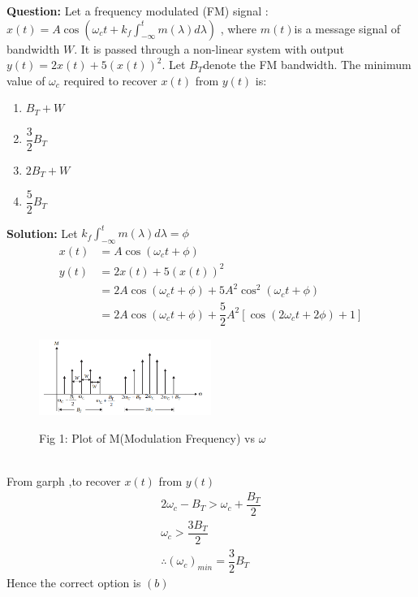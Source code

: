 \documentclass[journal,12pt,twocolumn]{IEEEtran}
\theoremstyle{remark}
\begin{document}
\textbf{Question:} Let a frequency modulated (FM) signal : $ x(t) = A \cos(\omega_c t + k_f \int_{-\infty}^{t} m(\lambda) d\lambda)$ , where $ m(t) $is a message signal of bandwidth $ W $. It is passed through a non-linear system with output $y(t) = 2x(t) + 5(x(t))^2 $.
Let $B_T $denote the FM bandwidth. The minimum value of $ \omega_c $ required to recover $ x(t) $ from $ y(t) $ is:\\
\begin{enumerate}[label = (\Alph*)]
\item $B_T + W$ \\
\item $\dfrac{3}{2} B_T$ \\
\item $2B_T + W$ \\
\item $\dfrac{5}{2} B_T$ \\
\end{enumerate}
\textbf{Solution: }
Let $k_f \int_{-\infty}^{t} m(\lambda) d\lambda = \phi $
\begin{align}
 x(t) &= A \cos(\omega_c t + \phi) \\
 y(t) &= 2x(t) + 5(x(t))^2 \\
 &= 2A \cos(\omega_c t + \phi) + 5A^{2}\cos^{2}(\omega_c t +  \phi  ) \\
 &= 2A \cos(\omega_c t +  \phi ) + \dfrac{5}{2}A^{2}[\cos(2\omega_c t +  2\phi ) + 1]
 \end{align}
\begin{figure}[h!]
  \centering
  \includegraphics[width=0.5\textwidth]{figures/cggate.png} 
 \label{cggatefig1}
 \caption*{Fig 1: Plot of M(Modulation Frequency) vs $\omega$  }
\end{figure}
\\From garph ,to recover $x(t)$ from $y(t)$
\begin{align}
2\omega_c - B_T > \omega_c + \dfrac{B_T}{2} \\
\omega_c > \dfrac{3B_T}{2} \\
\therefore(\omega_c)_{min} = \dfrac{3}{2}B_T
\end{align}
Hence the correct option is $(b)$
\end{document}

